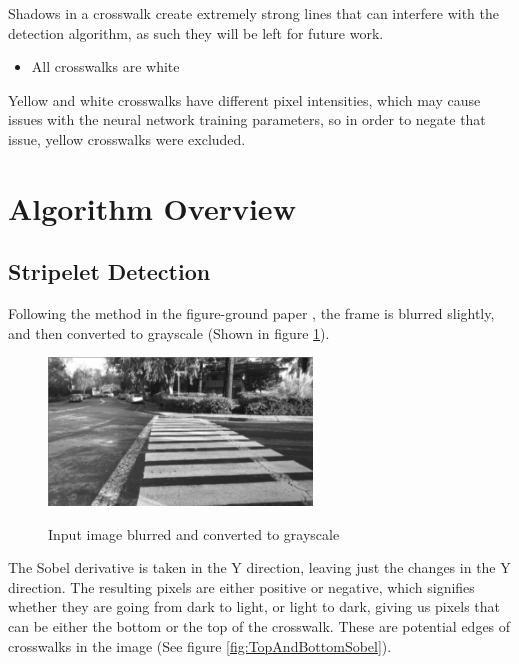 \documentclass[12pt]{ucthesis}
\newcommand{\captionfonts}{\small\bf\ssp}
\begin{document}
Shadows in a crosswalk create extremely strong lines that can interfere with the detection algorithm, as such they will be left for future work. 

\begin{itemize}
\item All crosswalks are white
\end{itemize}

Yellow and white crosswalks have different pixel intensities, which may cause issues with the neural network training parameters, so in order to negate that issue, yellow crosswalks were excluded. 

\section{Algorithm Overview}
\label{Algorithm Overview}

\subsection{Stripelet Detection}

Following the method in the figure-ground paper \cite{Coughlan2006}, the frame is blurred slightly, and then converted to grayscale (Shown in figure \ref{fig:SlightlyBlurred}). 

\begin{figure}[h!]
\begin{center}
\includegraphics[width=7cm]{SlightlyBlurredInput.png}
\captionfonts
\caption[Grayscale Image]{Input image blurred and converted to grayscale}
\label{fig:SlightlyBlurred}
\end{center}
\end{figure}

The Sobel derivative is taken in the Y direction, leaving just the changes in the Y direction. The resulting pixels are either positive or negative, which signifies whether they are going from dark to light, or light to dark, giving us pixels that can be either the bottom or the top of the crosswalk. These are potential edges of crosswalks in the image (See figure \ref{fig:TopAndBottomSobel}). 
\end{document}
